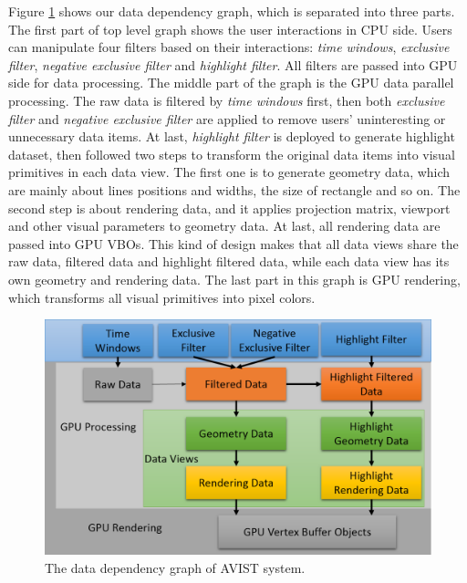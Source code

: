 \documentclass[journal]{vgtc}                %
\begin{document}
{Figure \ref{fig:datagraph} shows our data dependency graph, which is separated into three parts. The first part of top level graph shows the user interactions in CPU side. Users can manipulate four filters based on their interactions: \emph{time windows}, \emph{exclusive filter}, \emph{negative exclusive filter} and \emph{highlight filter}. All filters are passed into GPU side for data processing. The middle part of the graph is the GPU data parallel processing. The raw data is filtered by \emph{time windows} first, then both \emph{exclusive filter} and \emph{negative exclusive filter} are applied to remove users' uninteresting or unnecessary data items. At last, \emph{highlight filter} is deployed to generate highlight dataset,  then followed two steps to transform the original data items into visual primitives in each data view. The first one is to generate geometry data, which are mainly about lines positions and widths, the size of rectangle and so on. The second step is about rendering data, and it applies projection matrix, viewport and other visual parameters to geometry data. At last, all rendering data are passed into GPU VBOs. This kind of design makes that all data views share the raw data, filtered data and highlight filtered data, while each data view has its own geometry and rendering data. The last part in this graph is GPU rendering, which transforms all visual primitives into pixel colors.  

 \begin{figure}[htb]
 	\centering
 	\includegraphics[width=1.0\linewidth]{pic/graph.png}
 	\parbox[t]{1.0\columnwidth}{\relax
 	}
 	\caption{\label{fig:datagraph} The data dependency graph of AVIST system.}
 \end{figure} 
 
}
\end{document}
